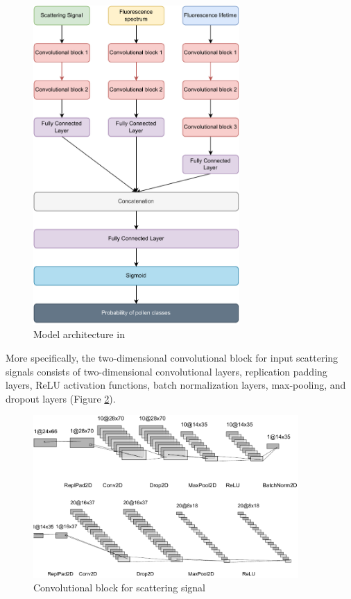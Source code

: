 \documentclass{article}
\begin{document}
\begin{figure}
  \centering
  \includegraphics[width=0.7\textwidth]{arch.pdf}
  \caption{Model architecture in \cite{sauliene_automatic_2019}}\label{fig::arch}
\end{figure}

More specifically, the two-dimensional convolutional block for input scattering signals consists of two-dimensional convolutional layers, replication padding layers, ReLU activation functions, batch normalization layers, max-pooling, and dropout layers (Figure \ref{fig::conv}).

\begin{figure}
  \centering
  \includegraphics[width=0.9\textwidth]{convblock.pdf}
  \caption{Convolutional block for scattering signal}\label{fig::conv}
\end{figure}
\end{document}
